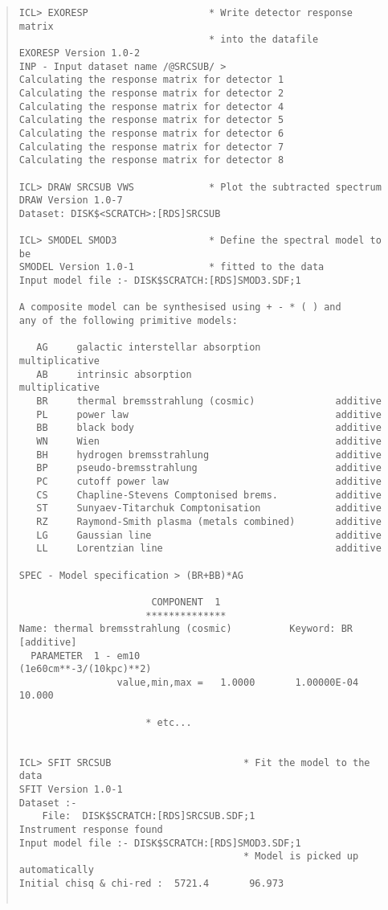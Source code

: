 \begin{quote}
\begin{verbatim}
ICL> EXORESP                     * Write detector response matrix 
                                 * into the datafile
EXORESP Version 1.0-2
INP - Input dataset name /@SRCSUB/ > 
Calculating the response matrix for detector 1
Calculating the response matrix for detector 2
Calculating the response matrix for detector 4
Calculating the response matrix for detector 5
Calculating the response matrix for detector 6
Calculating the response matrix for detector 7
Calculating the response matrix for detector 8

ICL> DRAW SRCSUB VWS             * Plot the subtracted spectrum
DRAW Version 1.0-7
Dataset: DISK$<SCRATCH>:[RDS]SRCSUB

ICL> SMODEL SMOD3                * Define the spectral model to be
SMODEL Version 1.0-1             * fitted to the data
Input model file :- DISK$SCRATCH:[RDS]SMOD3.SDF;1

A composite model can be synthesised using + - * ( ) and
any of the following primitive models:

   AG     galactic interstellar absorption             multiplicative
   AB     intrinsic absorption                         multiplicative
   BR     thermal bremsstrahlung (cosmic)              additive      
   PL     power law                                    additive      
   BB     black body                                   additive      
   WN     Wien                                         additive      
   BH     hydrogen bremsstrahlung                      additive      
   BP     pseudo-bremsstrahlung                        additive      
   PC     cutoff power law                             additive      
   CS     Chapline-Stevens Comptonised brems.          additive      
   ST     Sunyaev-Titarchuk Comptonisation             additive      
   RZ     Raymond-Smith plasma (metals combined)       additive      
   LG     Gaussian line                                additive      
   LL     Lorentzian line                              additive      

SPEC - Model specification > (BR+BB)*AG

                       COMPONENT  1
                      **************
Name: thermal bremsstrahlung (cosmic)          Keyword: BR     [additive]
  PARAMETER  1 - em10                       (1e60cm**-3/(10kpc)**2)         
                 value,min,max =   1.0000       1.00000E-04    10.000    

                      * etc...


ICL> SFIT SRCSUB                       * Fit the model to the data
SFIT Version 1.0-1
Dataset :-
    File:  DISK$SCRATCH:[RDS]SRCSUB.SDF;1
Instrument response found
Input model file :- DISK$SCRATCH:[RDS]SMOD3.SDF;1
                                       * Model is picked up automatically
Initial chisq & chi-red :  5721.4       96.973    


\end{verbatim}
\end{quote}
